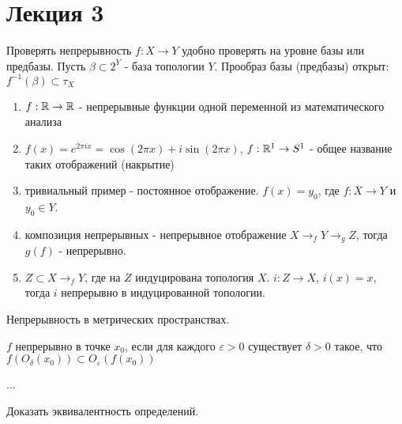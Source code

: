 \section{Лекция 3}



\begin{nota_bene}[филосовское]
    Проверять непрерывность $f: X \rightarrow Y$ удобно проверять на уровне базы или предбазы.
    Пусть $\beta \subset 2^Y$ - база топологии $Y$.
    Прообраз базы (предбазы) открыт: $f^{-1}(\beta) \subset \tau_X$
\end{nota_bene}

\begin{example}
    \begin{enumerate}
        \item $f: \mathbb{R} \rightarrow \mathbb{R}$ - непрерывные функции одной переменной из математического анализа
        \item $f(x) = e^{2 \pi i x} = \cos (2\pi x) + i \sin (2\pi x)$, $f: \mathbb{R}^1 \rightarrow S^1$ - общее название таких отображений (накрытие)
        \item тривиальный пример - постоянное отображение. $f(x) = y_0$, где $f: X \rightarrow Y$ и $y_0 \in Y$.
        \item композиция непрерывных - непрерывное отображение $X \rightarrow_{f} Y \rightarrow_{g} Z$, тогда $g(f)$ - непрерывно.
        \item $Z \subset X \rightarrow_f Y$, где на $Z$ индуцирована топология $X$. $i: Z \rightarrow X$, $i(x) = x$, тогда $i$ непрерывно в индуцированной топологии.
    \end{enumerate}
\end{example}

Непрерывность в метрических пространствах.

\begin{definition}[По Коши]
    $f$ непрерывно в точке $x_0$, если для каждого $\varepsilon > 0$ существует $\delta > 0$ такое, что $f(O_{\delta}(x_0)) \subset O_{\varepsilon}(f(x_0))$
\end{definition}
\begin{definition}[По Гейне]
    ...
\end{definition}

\begin{exercise}
    Доказать эквивалентность определений.
\end{exercise}

